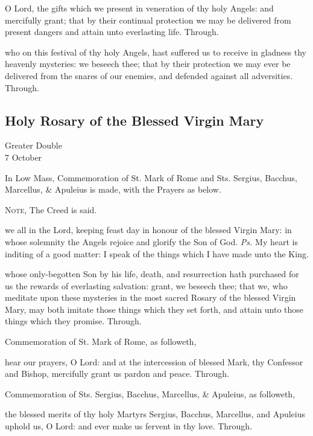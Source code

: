 
\secret
{} O Lord, the gifts which we present in veneration of thy holy Angels: and mercifully grant; that by their continual protection we may be delivered from present dangers and attain unto everlasting life. Through.


\postcommunion
{} who on this festival of thy holy Angels, hast suffered us to receive in gladness thy heavenly mysteries: we beseech thee; that by their protection we may ever be delivered from the snares of our enemies, and defended against all adversities. Through.


\clearpage
\subsection{Holy Rosary of the Blessed Virgin Mary}
\begin{inhead}
	{Greater Double\\
		7 October}
\end{inhead}
\begin{rubric}
	In Low Mass, Commemoration of St. Mark of Rome and Sts. Sergius, Bacchus, Marcellus, \& Apuleius is made, with the Prayers as below.
	
	\textsc{Note,} The Creed is said.
\end{rubric}

\introit
{} we all in the Lord, keeping feast day in honour of the blessed Virgin Mary: in whose solemnity the Angels rejoice and glorify the Son of God. \textit{Ps.} My heart is inditing of a good matter: I speak of the things which I have made unto the King.

\collect
{} whose only-begotten Son by his life, death, and resurrection hath purchased for us the rewards of everlasting salvation: grant, we beseech thee; that we, who meditate upon these mysteries in the most sacred Rosary of the blessed Virgin Mary, may both imitate those things which they set forth, and attain unto those things which they promise. Through.
\begin{rubric}
	Commemoration of St. Mark of Rome, as followeth,
\end{rubric}
 hear our prayers, O Lord: and at the intercession of blessed Mark, thy Confessor and Bishop, mercifully grant us pardon and peace. Through.
\begin{rubric}
	Commemoration of Sts. Sergius, Bacchus, Marcellus, \& Apuleius, as followeth,
\end{rubric}
 the blessed merits of thy holy Martyrs Sergius, Bacchus, Marcellus, and Apuleius uphold us, O Lord: and ever make us fervent in thy love. Through.


